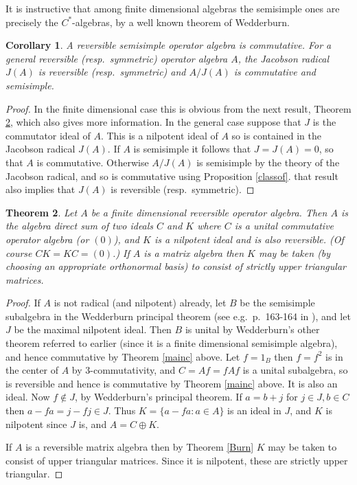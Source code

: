 \documentclass{amsart}
\newtheorem{theorem}{Theorem}[section]
\newtheorem{corollary}[theorem]{Corollary}
\theoremstyle{remark}
\theoremstyle{definition}
\numberwithin{equation}{section}
\begin{document}
  It is instructive that among finite dimensional algebras the semisimple ones  are precisely the $C^*$-algebras, by a well known theorem of Wedderburn. 

  
\begin{corollary} \label{chss}  A       reversible  semisimple operator  algebra is commutative.  For a general  reversible  (resp.\ symmetric) operator  algebra $A$, the Jacobson radical $J(A)$ is reversible  (resp.\ symmetric) and 
     $A/J(A)$ is commutative and semisimple.  
 \end{corollary}
 
 \begin{proof} In the finite dimensional  case this is obvious from the next result, Theorem \ref{wed}, which also gives more information.
In the general case suppose that $J$ is the commutator ideal of $A$.  This is a nilpotent ideal of $A$ so is contained in 
the Jacobson radical $J(A)$.  If $A$ is semisimple it follows that $J = J(A) = 0$, so that $A$ is commutative.
Otherwise $A/J(A)$ is semisimple by the theory of the Jacobson radical, and so is commutative using Proposition \ref{classof}.  
that result also implies that  $J(A)$ is reversible  (resp.\ symmetric).  \end{proof}



     \begin{theorem} \label{wed}   Let $A$ be  a  finite dimensional 
     reversible  operator  algebra. Then $A$ is the algebra direct sum of two ideals $C$ and $K$ where $C$ is a unital commutative operator  algebra (or $(0)$), and $K$ is a 
  nilpotent ideal and is also reversible.  
  (Of course $CK = KC = (0)$.) If $A$ is a matrix algebra then $K$ may be taken (by choosing an appropriate orthonormal basis) to consist of strictly upper triangular matrices.  \end{theorem}
 
\begin{proof}   If $A$ is not radical (and nilpotent) already, let 
      $B$ be the semisimple subalgebra in the Wedderburn principal theorem
      (see e.g.\ p.\ 163-164 in \cite{Row}), and let $J$ be the maximal nilpotent ideal.
      Then $B$ is unital by Wedderburn's other theorem referred to earlier (since it is a finite dimensional  semisimple algebra), and hence commutative by Theorem  \ref{mainc} above.
     Let $f = 1_B$ then $f = f^2$ is in the center of $A$ by 3-commutativity,
     and $C = Af = fAf$ is a unital subalgebra, so is reversible and hence 
     is commutative by Theorem  \ref{mainc}  above.  
      It is also an ideal.  Now $f \notin J$, by Wedderburn's principal theorem.
     If $a = b + j$ for $j \in J, b \in C$ then $a - fa = j - fj \in J$.
     Thus $K = \{ a - f a : a \in A \}$ is an ideal in $J$, and $K$ is nilpotent since $J$ is, and $A = C \oplus K$.  
     
      If $A$ is a reversible matrix algebra then by Theorem \ref{Burn} 
      $K$ may be taken  to consist of upper triangular matrices.  Since it is nilpotent, these are 
  strictly upper triangular. 
 \end{proof}
 
\end{document}
